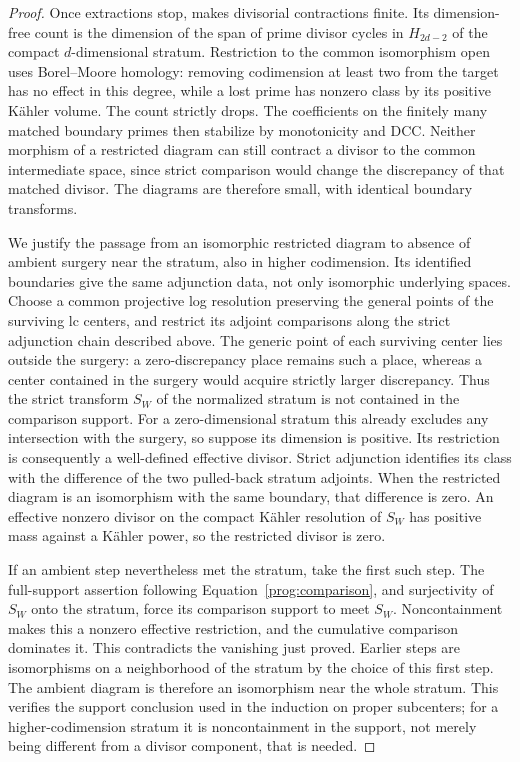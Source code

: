\begin{proof}
Once extractions stop, \cite[Lemma~7.8]{CB} makes
divisorial contractions finite.  Its dimension-free count
is the dimension of the span of prime divisor cycles in
\(H_{2d-2}\) of the compact \(d\)-dimensional stratum.
Restriction to the common isomorphism open uses
Borel--Moore homology: removing codimension at least two
from the target has no effect in this degree, while a lost
prime has nonzero class by its positive Kähler volume.
The count strictly drops.  The coefficients on the
finitely many matched boundary primes then stabilize by
monotonicity and DCC.  Neither morphism of a restricted
diagram can still contract a divisor to the common
intermediate space, since strict comparison would change
the discrepancy of that matched divisor.  The diagrams are
therefore small, with identical boundary transforms.

We justify the passage from an isomorphic restricted diagram to
absence of ambient surgery near the stratum, also in higher
codimension. Its identified boundaries give the same adjunction data,
not only isomorphic underlying spaces. Choose a common projective log
resolution preserving the general points of the surviving lc centers,
and restrict its adjoint comparisons along the strict adjunction
chain described above. The generic point of each surviving center
lies outside the surgery: a zero-discrepancy place remains such a
place, whereas a center contained in the surgery would acquire
strictly larger discrepancy. Thus the strict transform \(S_W\) of
the normalized stratum is not contained in the comparison support.
For a zero-dimensional stratum this already excludes any intersection
with the surgery, so suppose its dimension is positive.
Its restriction is consequently a well-defined effective divisor.
Strict adjunction identifies its class with the difference of the
two pulled-back stratum adjoints. When the restricted diagram is an
isomorphism with the same boundary, that difference is zero.
An effective nonzero divisor on the compact Kähler resolution of
\(S_W\) has positive mass against a Kähler power, so the restricted
divisor is zero.

If an ambient step nevertheless met the stratum, take the first such
step. The full-support assertion following
Equation~\eqref{prog:comparison}, and surjectivity of \(S_W\) onto
the stratum, force its comparison support to meet \(S_W\).
Noncontainment makes this a nonzero effective restriction, and the
cumulative comparison dominates it. This contradicts the vanishing
just proved. Earlier steps are isomorphisms on a neighborhood of the
stratum by the choice of this first step. The ambient diagram is
therefore an isomorphism near the whole stratum. This verifies the
support conclusion used in the induction on proper subcenters;
for a higher-codimension stratum it is noncontainment in the support,
not merely being different from a divisor component, that is needed.


\end{proof}
